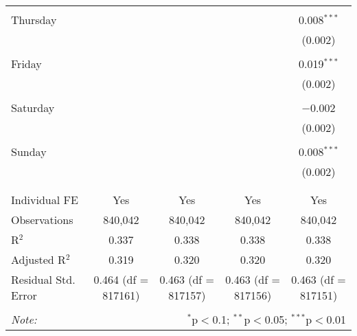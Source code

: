 \documentclass[
]{article}
\begin{document}
\begin{table}[!htbp]
{\begin{tabular}{@{\extracolsep{5pt}}lcccc}
  & & & & \\ 
 Thursday &  &  &  & 0.008$^{***}$ \\ 
  &  &  &  & (0.002) \\ 
  & & & & \\ 
 Friday &  &  &  & 0.019$^{***}$ \\ 
  &  &  &  & (0.002) \\ 
  & & & & \\ 
 Saturday &  &  &  & $-$0.002 \\ 
  &  &  &  & (0.002) \\ 
  & & & & \\ 
 Sunday &  &  &  & 0.008$^{***}$ \\ 
  &  &  &  & (0.002) \\ 
  & & & & \\ 
\hline \\[-1.8ex] 
Individual FE & Yes & Yes & Yes & Yes \\ 
Observations & 840,042 & 840,042 & 840,042 & 840,042 \\ 
R$^{2}$ & 0.337 & 0.338 & 0.338 & 0.338 \\ 
Adjusted R$^{2}$ & 0.319 & 0.320 & 0.320 & 0.320 \\ 
Residual Std. Error & 0.464 (df = 817161) & 0.463 (df = 817157) & 0.463 (df = 817156) & 0.463 (df = 817151) \\ 
\hline 
\hline \\[-1.8ex] 
\textit{Note:}  & \multicolumn{4}{r}{$^{*}$p$<$0.1; $^{**}$p$<$0.05; $^{***}$p$<$0.01} \\ 
\end{tabular}
} 
\end{table} 
\newpage
\end{document}
